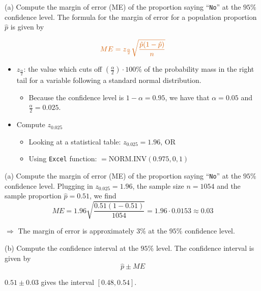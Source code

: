 \documentclass[
  11pt,
  ignorenonframetext,
]{beamer}
\providecommand{\tightlist}{%
  \setlength{\itemsep}{0pt}\setlength{\parskip}{0pt}}
\begin{document}
\begin{frame}[fragile]{(a) Compute the margin of error (ME) of the
proportion saying ``\texttt{No}'' at the \(95\%\) confidence level.}
\protect\hypertarget{a-compute-the-margin-of-error-me-of-the-proportion-saying-no-at-the-95-confidence-level.}{}
The formula for the margin of error for a population proportion
\(\hat{p}\) is given by

\[
\color{red}{ME = z_{\frac{\alpha}{2}} \sqrt{\frac{\hat{p}(1-\hat{p})}{n}}}
\]

\begin{itemize}
\tightlist
\item
  \(z_{\frac{\alpha}{2}}\): the value which cuts off
  \((\frac{\alpha}{2})\cdot 100\%\) of the probability mass in the right
  tail for a variable following a standard normal distribution.

  \begin{itemize}
  \tightlist
  \item
    Because the confidence level is \(1-\alpha=0.95\), we have that
    \(\alpha=0.05\) and \(\frac{\alpha}{2}=0.025\).
  \end{itemize}
\item
  Compute \(z_{0.025}\)

  \begin{itemize}
  \tightlist
  \item
    Looking at a statistical table: \(z_{0.025} = 1.96\), OR
  \item
    Using \texttt{Excel} function: \(=\text{NORM.INV}(0.975,0,1)\)
  \end{itemize}
\end{itemize}
\end{frame}

\begin{frame}{(a) Compute the margin of error (ME) of the proportion
saying ``\texttt{No}'' at the \(95\%\) confidence level.}
\protect\hypertarget{a-compute-the-margin-of-error-me-of-the-proportion-saying-no-at-the-95-confidence-level.-1}{}
Plugging in \(z_{0.025} = 1.96\), the sample size \(n = 1054\) and the
sample proportion \(\hat{p} = 0.51\), we find \[
ME = 1.96 \sqrt{\frac{0.51(1-0.51)}{1054}} = 1.96 \cdot{0.0153} \approx 0.03
\]

\(\Rightarrow\) The margin of error is approximately \(3\%\) at the
\(95\%\) confidence level.
\end{frame}

\begin{frame}{(b) Compute the confidence interval at the \(95\%\)
level.}
\protect\hypertarget{b-compute-the-confidence-interval-at-the-95-level.}{}
The confidence interval is given by \[
\hat{p} \pm ME
\]

\(0.51 \pm 0.03\) gives the interval \([0.48,0.54]\).
\end{frame}
\end{document}
